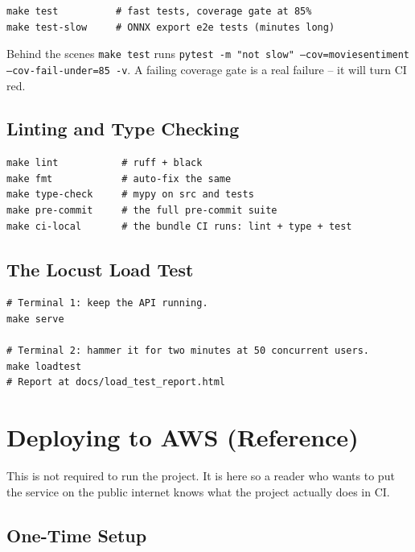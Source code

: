 \documentclass[11pt,a4paper]{article}
\begin{document}
\begin{lstlisting}
make test          # fast tests, coverage gate at 85%
make test-slow     # ONNX export e2e tests (minutes long)
\end{lstlisting}

\noindent Behind the scenes \texttt{make test} runs
\texttt{pytest -m "not slow" --cov=moviesentiment --cov-fail-under=85 -v}. A failing
coverage gate is a real failure -- it will turn CI red.

\subsection{Linting and Type Checking}

\begin{lstlisting}
make lint           # ruff + black
make fmt            # auto-fix the same
make type-check     # mypy on src and tests
make pre-commit     # the full pre-commit suite
make ci-local       # the bundle CI runs: lint + type + test
\end{lstlisting}

\subsection{The Locust Load Test}

\begin{lstlisting}
# Terminal 1: keep the API running.
make serve

# Terminal 2: hammer it for two minutes at 50 concurrent users.
make loadtest
# Report at docs/load_test_report.html
\end{lstlisting}

\section{Deploying to AWS (Reference)}

This is not required to run the project. It is here so a reader who wants to put
the service on the public internet knows what the project actually does in CI.

\subsection{One-Time Setup}
\end{document}
